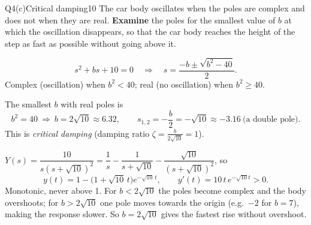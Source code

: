 \begin{qcard}{Q4(c)}{Critical damping}{10}
The car body oscillates when the poles are complex and does not when they are real. \textbf{Examine} the poles for the smallest value of $b$ at which the oscillation disappears, so that the car body reaches the height of the step as fast as possible without going above it.
\end{qcard}
\begin{solution}
\[s^2+bs+10=0\quad\Longrightarrow\quad s=\frac{-b\pm\sqrt{b^2-40}}{2}.\]
Complex (oscillation) when $b^2<40$; real (no oscillation) when $b^2\ge40$.

 The smallest $b$ with real poles is
\[b^2=40\ \Rightarrow\ \boxed{b=2\sqrt{10}\approx6.32},\qquad s_{1,2}=-\frac b2=-\sqrt{10}\approx-3.16\ \text{(a double pole)}.\]
This is \emph{critical damping} (damping ratio $\zeta=\frac{b}{2\sqrt{10}}=1$).

 $Y(s)=\dfrac{10}{s(s+\sqrt{10})^2}=\dfrac1s-\dfrac1{s+\sqrt{10}}-\dfrac{\sqrt{10}}{(s+\sqrt{10})^2}$, so
\[y(t)=1-\big(1+\sqrt{10}\,t\big)e^{-\sqrt{10}\,t},\qquad y'(t)=10\,t\,e^{-\sqrt{10}t}>0 .\]
Monotonic, never above 1. For $b<2\sqrt{10}$ the poles become complex and the body overshoots; for $b>2\sqrt{10}$ one pole moves towards the origin (e.g.\ $-2$ for $b=7$), making the response slower. So $b=2\sqrt{10}$ gives the fastest rise without overshoot.

\begin{center}
\end{center}


\end{solution}
